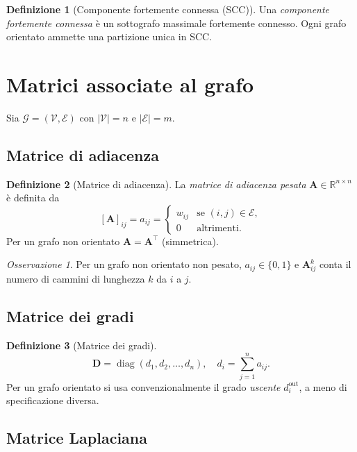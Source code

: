 \documentclass[a4paper,11pt]{article}
\theoremstyle{definition}
\newtheorem{defn}{Definizione}[section]
\theoremstyle{plain}
\theoremstyle{remark}
\newtheorem{oss}{Osservazione}[section]
\newcommand{\R}{\mathbb{R}}
\newcommand{\mat}[1]{\mathbf{#1}}
\DeclareMathOperator{\diag}{diag}
\begin{document}
\begin{defn}[Componente fortemente connessa (SCC)]
Una \emph{componente fortemente connessa} è un sottografo massimale fortemente
connesso. Ogni grafo orientato ammette una partizione unica in SCC.
\end{defn}

\section{Matrici associate al grafo}

Sia $\mathcal{G}=(\mathcal{V},\mathcal{E})$ con $|\mathcal{V}|=n$ e $|\mathcal{E}|=m$.

\subsection{Matrice di adiacenza}

\begin{defn}[Matrice di adiacenza]
La \emph{matrice di adiacenza pesata} $\mat{A} \in \R^{n \times n}$ è definita da
\[
  [\mat{A}]_{ij} = a_{ij} =
  \begin{cases}
    w_{ij} & \text{se } (i,j) \in \mathcal{E},\\
    0       & \text{altrimenti.}
  \end{cases}
\]
Per un grafo non orientato $\mat{A} = \mat{A}^\top$ (simmetrica).
\end{defn}

\begin{oss}
Per un grafo non orientato non pesato, $a_{ij} \in \{0,1\}$ e
$\mat{A}^k_{ij}$ conta il numero di cammini di lunghezza $k$ da $i$ a $j$.
\end{oss}

\subsection{Matrice dei gradi}

\begin{defn}[Matrice dei gradi]
\[
  \mat{D} = \diag(d_1, d_2, \ldots, d_n),
  \quad d_i = \sum_{j=1}^n a_{ij}.
\]
Per un grafo orientato si usa convenzionalmente il grado \emph{uscente}
$d_i^{\text{out}}$, a meno di specificazione diversa.
\end{defn}

\subsection{Matrice Laplaciana}
\end{document}
